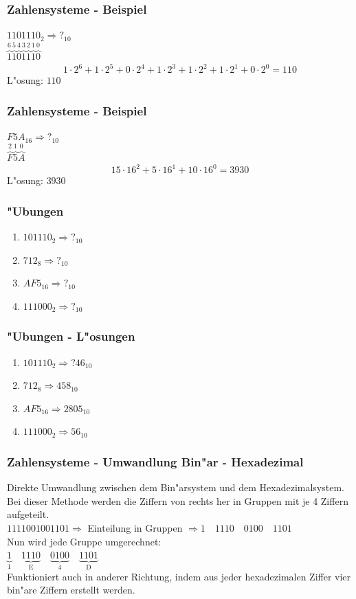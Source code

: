 \documentclass{beamer}
\begin{document}
\frame
{
	\frametitle{Zahlensysteme - Beispiel}
	$1101110_{2} \Rightarrow ?_{10}$\\
	\vspace{3mm}
	$\overbrace{1}^\text{6} \overbrace{1}^\text{5} \overbrace{0}^\text{4} \overbrace{1}^\text{3} \overbrace{1}^\text{2} \overbrace{1}^\text{1} \overbrace{0}^\text{0}$
	\vspace{3mm}
	\begin{displaymath}
	1 \cdot 2^6 + 1 \cdot 2^5 + 0 \cdot 2^4 + 1 \cdot 2^3 + 1 \cdot 2^2 + 1 \cdot 2^1 + 0 \cdot 2^0 = 110
	\end{displaymath}
	\vspace{3mm}
	L"osung: $110$
}

\frame
{
	\frametitle{Zahlensysteme - Beispiel}
	$F5A_{16} \Rightarrow ?_{10}$\\
	\vspace{3mm}
	$\overbrace{F}^\text{2} \overbrace{5}^\text{1} \overbrace{A}^\text{0}$
	\vspace{3mm}
	\begin{displaymath}
	15 \cdot 16^2 + 5 \cdot 16^1 + 10 \cdot 16^0 = 3930
	\end{displaymath}
	\vspace{3mm}
	L"osung: $3930$
}

\frame
{
	\frametitle{"Ubungen}
	\begin{enumerate}
	\item $101110_{2} \Rightarrow ?_{10}$
	\item $712_{8} \Rightarrow ?_{10}$
	\item $AF5_{16} \Rightarrow ?_{10}$
	\item $111000_{2} \Rightarrow ?_{10}$
	\end{enumerate}
}

\frame
{
	\frametitle{"Ubungen - L"osungen}
	\begin{enumerate}
	\item $101110_{2} \Rightarrow ?46_{10}$
	\item $712_{8} \Rightarrow 458_{10}$
	\item $AF5_{16} \Rightarrow 2805_{10}$
	\item $111000_{2} \Rightarrow 56_{10}$
	\end{enumerate}
}

\frame
{
	\frametitle{Zahlensysteme - Umwandlung Bin"ar - Hexadezimal}
	Direkte Umwandlung zwischen dem Bin"arsystem und dem Hexadezimalsystem.\\
	Bei dieser Methode werden die Ziffern von rechts her in Gruppen mit
	je 4 Ziffern aufgeteilt.\\
	{\small
	$1111001001101 \Rightarrow$ Einteilung in Gruppen $\Rightarrow 1 \quad 1110 \quad 0100 \quad 1101$
	}\\
	\vspace{3mm}
	Nun wird jede Gruppe umgerechnet:\\
	\vspace{3mm}
	$\underbrace{1}_\text{1} \quad \underbrace{1110}_\text{E} \quad \underbrace{0100}_\text{4} \quad \underbrace{1101}_\text{D}$\\
	\vspace{3mm}
	Funktioniert auch in anderer Richtung, indem aus jeder hexadezimalen Ziffer vier bin"are Ziffern erstellt werden.
}
\end{document}
